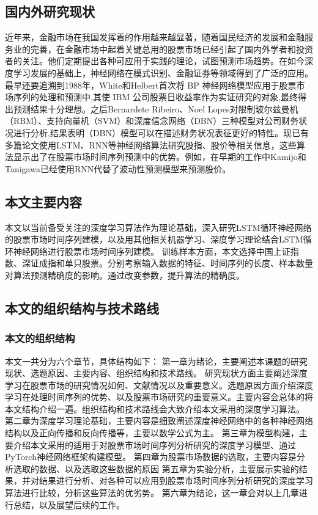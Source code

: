 \documentclass[UTF8]{ctexart}
\begin{document}
\subsection{国内外研究现状}
近年来，金融市场在我国发挥着的作用越来越显著，随着国民经济的发展和金融服务业的完善，在金融市场中起着关键总用的股票市场已经引起了国内外学者和投资者的关注。他们定期提出各种可应用于实践的理论，试图预测市场趋势\cite{Lahmiri2015,Chiang2015,Seddon2017,Zhou2016,Ichinose2018}。在如今深度学习发展的基础上\cite{Gers2002,Hinton2006,Jiang2018,Kim2015,Kuremoto2014,Torres2017}，神经网络在模式识别、金融证券等领域得到了广泛的应用。最早还要追溯到1988年，White和Helbert首次将 BP 神经网络模型应用于股票市场序列的处理和预测中,其使 IBM 公司股票日收益率作为实证研究的对象,最终得出预测结果十分理想\cite{White1988}。之后Bernardete Ribeiro、Noel Lopes对限制玻尔兹曼机（RBM）、支持向量机（SVM）和深度信念网络（DBN）三种模型对公司财务状况进行分析,结果表明（DBN）模型可以在描述财务状况表征更好的特性\cite{Ribeiro2011}。现已有多篇论文使用LSTM、RNN等神经网络算法研究股指、股价等相关信息\cite{Pang2018,Chong2017,Bao2017,Chen2015,Fischer2018,Hsieh2011,Huynh2017,Liu2017}，这些算法显示出了在股票市场时间序列预测中的优势。例如，在早期的工作中Kamijo和Tanigawa已经使用RNN代替了波动性预测模型来预测股价\cite{Kamijo1990}。
\subsection{本文主要内容}
本文以当前备受关注的深度学习算法作为理论基础，深入研究LSTM循环神经网络的股票市场时间序列建模，以及用其他相关机器学习、深度学习理论结合LSTM循环神经网络进行股票市场时间序列建模。
训练样本方面，本文选择中国上证指数、深证成指和单只股票。分别考察输入数据的特征、时间序列的长度、样本数量对算法预测精确度的影响。通过改变参数，提升算法的精确度。
\subsection{本文的组织结构与技术路线}
\subsubsection{本文的组织结构}
本文一共分为六个章节，具体结构如下：
第一章为绪论，主要阐述本课题的研究现状、选题原因、主要内容、组织结构和技术路线。
研究现状方面主要阐述深度学习在股票市场的研究情况如何、文献情况以及重要意义。选题原因方面介绍深度学习在处理时间序列的优势、以及股票市场研究的重要意义。主要内容会总体的将本文结构介绍一遍。组织结构和技术路线会大致介绍本文采用的深度学习算法。
第二章为深度学习理论基础，主要内容是细致阐述深度神经网络中的各种神经网络结构以及正向传播和反向传播等，主要以数学公式为主。
第三章为模型构建，主要介绍本文采用的适用于对股票市场时间序列分析研究的深度学习模型、通过PyTorch神经网络框架构建模型。
第四章为股票市场数据的选取，主要内容是分析选取的数据、以及选取这些数据的原因
第五章为实验分析，主要展示实验的结果，并对结果进行分析、对各种可以应用到股票市场时间序列分析研究的深度学习算法进行比较，分析这些算法的优劣势。
第六章为结论，这一章会对以上几章进行总结，以及展望后续的工作。
\end{document}
